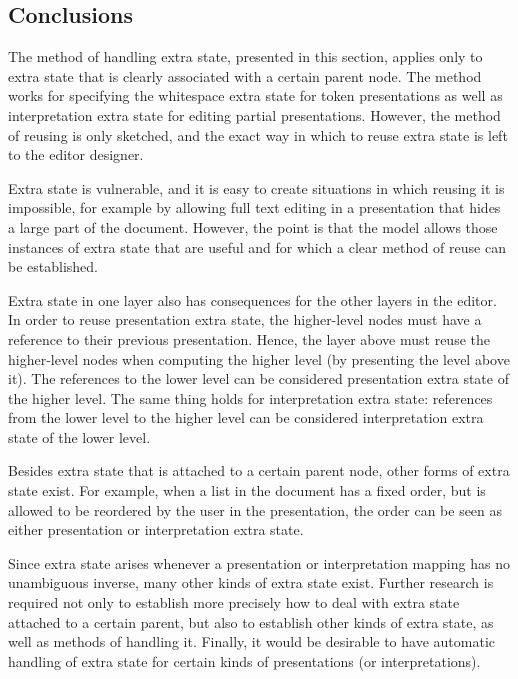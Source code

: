 \subsection{Conclusions}

The method of handling extra state, presented in this section, applies only to extra state that is clearly associated with a certain parent node. The method works for specifying the whitespace extra state for token presentations as well as interpretation extra state for editing partial presentations. However, the method of reusing is only sketched, and the exact way in which to reuse extra state is left to the editor designer.

Extra state is vulnerable, and it is easy to create situations in which reusing it is impossible, for example by allowing full text editing in a presentation that hides a large part of the document. However, the point is that the model allows those instances of extra state that are useful and for which a clear method of reuse can be established.

Extra state in one layer also has consequences for the other layers in the editor. In order to reuse presentation extra state, the higher-level nodes must have a reference to their previous presentation. Hence, the layer above must reuse the higher-level nodes when computing the higher level (by presenting the level above it). The references to the lower level can be considered presentation extra state of the higher level. The same thing holds for interpretation extra state: references from the lower level to the higher level can be considered interpretation extra state of the lower level.

Besides extra state that is attached to a certain parent node, other forms of extra state exist. For example, when a list in the document has a fixed order, but is allowed to be reordered by the user in the presentation, the order can be seen as either presentation or interpretation extra state.


Since extra state arises whenever a presentation or interpretation mapping has no unambiguous inverse, many other kinds of extra state exist. Further research is required not only to establish more precisely how to deal with extra state attached to a certain parent, but also to establish other kinds of extra state, as well as methods of handling it. Finally, it would be desirable to have automatic handling of extra state for certain kinds of presentations (or interpretations).



